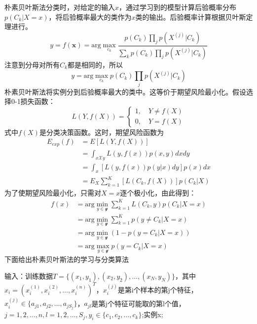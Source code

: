 朴素贝叶斯法分类时，对给定的输入$x$，通过学习到的模型计算后验概率分布$p(C_k|X=x)$，将后验概率最大的类作为$x$类的输出。后验概率计算根据贝叶斯定理进行。
\begin{equation}
	y=f(\boldsymbol{x})=\mathrm{arg} \max\limits_{c_k} \frac{p(C_k)\prod_jp(X^{(j)}|C_k)}{\sum_kp(C_k)\prod_jp(X^{(j)}|C_k)}
\end{equation}
注意到分母对所有$C_k$都是相同的，所以 
\begin{equation}
	y=\mathrm{arg} \max\limits_{c_k} p(C_k)\prod_jp(X^{(j)}|C_k)
\end{equation}
朴素贝叶斯法将实例分到后验概率最大的类中。这等价于期望风险最小化。假设选择0-1损失函数：
\begin{equation}
	L(Y,f(X))=\begin{cases}
	1,\quad Y\ne f(X)\\
	0,\quad Y=f(X)
	\end{cases}
\end{equation}
式中$f(X)$是分类决策函数。这时，期望风险函数为
\begin{equation}
	\begin{aligned}
	E_{exp}(f)&=E[L(Y,f(X))]\\
	&=\int_{x\mathcal{X}y}L(y,f(x))p(x,y)dxdy\\
	&=\int_x[L(y,f(x))p(y|x)dy]p(x)dx\\
	&=E_X\sum_{k=1}^{K}[L(C_k,f(X))]p(C_k|X)
	\end{aligned}
\end{equation}
为了使期望风险最小化，只需对$X=x$逐个极小化，由此得到：
\begin{equation}
	\begin{aligned}
	f(x)&=\mathrm{arg} \min_{y\in \mathcal{y}}\sum_{k=1}^{K}L(C_k,y)p(C_k|X=x)\\
	&=\mathrm{arg} \min_{y\in \mathcal{y}}\sum_{k=1}^{K}p(y\ne C_k|X=x)\\
	&=\mathrm{arg} \min_{y\in \mathcal{y}}(1-p(y=C_k|X=x))\\
	&=\mathrm{arg} \max_{y\in \mathcal{y}}p(y=C_k|X=x)
	\end{aligned}
\end{equation}
下面给出朴素贝叶斯法的学习与分类算法

输入：训练数据$T=\{(x_1,y_1),(x_2,y_2),\dots, (x_N,y_N)\}$，其中$x_i=(x_i^{(1)},x_i^{(2)},\dots,x_i^{(n)})^T$，$x_i^{(j)}$是第i个样本的第j个特征，$x_i^{(j)}\in \{a_{j1},a_{j2},\dots, a_{jS_j}\}$，$a_{jl}$是第j个特征可能取的第l个值，$j=1,2,\dots, n,l=1,2,\dots, S_j, y_i\in \{c_1,c_2,\dots,c_k\}$;实例x;

